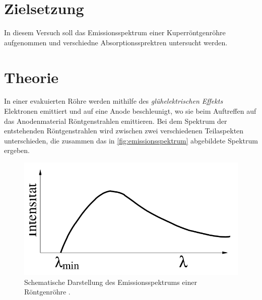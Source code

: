 \section{Zielsetzung}
\label{sec:ziel}
In diesem Versuch soll das Emissionsspektrum einer Kuperröntgenröhre aufgenommen und verschiedne Absorptionssprektren untersucht werden.

\section{Theorie}
\label{sec:Theorie}
In einer evakuierten Röhre werden mithilfe des \textit{glühelektrischen Effekts} Elektronen emittiert und auf eine Anode beschleunigt, wo sie beim Auftreffen
auf das Anodenmaterial Röntgenstrahlen emittieren. Bei dem Spektrum der entstehenden Röntgenstrahlen wird zwischen zwei verschiedenen Teilaspekten unterschieden, die zusammen
das in \autoref{fig:emissionsspektrum} abgebildete Spektrum ergeben.
\begin{figure}[H]
    \centering
    \includegraphics[width = 0.7 \textwidth]{data/emissionsspektrum.png}
    \caption{Schematische Darstellung des Emissionsspektrums einer Röntgenröhre \cite{Anleitung602}.}
    \label{fig:emissionsspektrum}
\end{figure}
